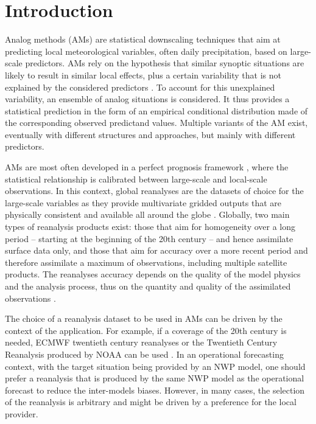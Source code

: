 \documentclass[alpha-refs]{wiley-article}
\begin{document}
\linenumbers

\section{Introduction}

Analog methods (AMs) are statistical downscaling techniques that aim at predicting local meteorological variables, often daily precipitation, based on large-scale predictors. AMs rely on the hypothesis that similar synoptic situations are likely to result in similar local effects, plus a certain variability that is not explained by the considered predictors \citep{Lorenz1969}. To account for this unexplained variability, an ensemble of analog situations is considered. It thus provides a statistical prediction in the form of an empirical conditional distribution made of the corresponding observed predictand values. Multiple variants of the AM exist, eventually with different structures and approaches, but mainly with different predictors.

AMs are most often developed in a perfect prognosis framework \citep{Rummukainen1997, Maraun2010}, where the statistical relationship is calibrated between large-scale and local-scale observations. In this context, global reanalyses are the datasets of choice for the large-scale variables as they provide multivariate gridded outputs that are physically consistent and available all around the globe \citep{Gelaro2017}. Globally, two main types of reanalysis products exist: those that aim for homogeneity over a long period -- starting at the beginning of the 20th century -- and hence assimilate surface data only, and those that aim for accuracy over a more recent period and therefore assimilate a maximum of observations, including multiple satellite products. The reanalyses accuracy depends on the quality of the model physics and the analysis process, thus on the quantity and quality of the assimilated observations \citep{Dee2011a}.

The choice of a reanalysis dataset to be used in AMs can be driven by the context of the application. For example, if a coverage of the 20th century is needed, ECMWF twentieth century reanalyses \citep[ERA-20C or CERA-20C --][]{Poli2016, Laloyaux2016} or the Twentieth Century Reanalysis \citep[20CR --][]{Compo2011} produced by NOAA can be used \citep[for example,][]{Kuentz2015, Caillouet2016, Brigode2016, Bonnet2017}. In an operational forecasting context, with the target situation being provided by an NWP model, one should prefer a reanalysis that is produced by the same NWP model as the operational forecast to reduce the inter-models biases. However, in many cases, the selection of the reanalysis is arbitrary and might be driven by a preference for the local provider.  
\end{document}
